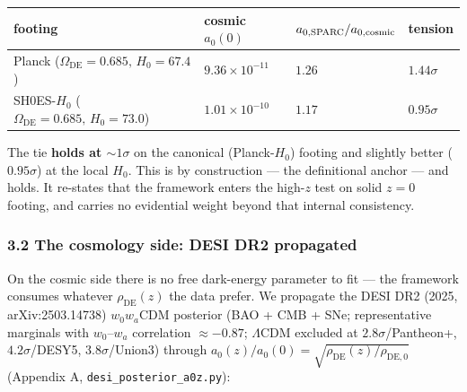 \documentclass[
]{article}
\newcounter{none} %
\begin{document}
{\def\LTcaptype{none} %
\begin{longtable}[]{@{}
  >{\raggedright\arraybackslash}p{}
  >{\raggedright\arraybackslash}p{}
  >{\raggedright\arraybackslash}p{}
  >{\raggedright\arraybackslash}p{}@{}}
\toprule\noalign{}
\begin{minipage}[b]{\linewidth}\raggedright
footing
\end{minipage} & \begin{minipage}[b]{\linewidth}\raggedright
cosmic \(a_0(0)\)
\end{minipage} & \begin{minipage}[b]{\linewidth}\raggedright
\(a_{0,\rm SPARC}/a_{0,\rm cosmic}\)
\end{minipage} & \begin{minipage}[b]{\linewidth}\raggedright
tension
\end{minipage} \\
\midrule\noalign{}
\endhead
\bottomrule\noalign{}
\endlastfoot
Planck (\(\Omega_\mathrm{DE}=0.685,\,H_0=67.4\)) & \(9.36\times10^{-11}\) &
\(1.26\) & \(1.44\sigma\) \\
SH0ES-\(H_0\) (\(\Omega_\mathrm{DE}=0.685,\,H_0=73.0\)) &
\(1.01\times10^{-10}\) & \(1.17\) & \(0.95\sigma\) \\
\end{longtable}
}

The tie \textbf{holds at \(\sim1\sigma\)} on the canonical
(Planck-\(H_0\)) footing and slightly better (\(0.95\sigma\)) at the
local \(H_0\). This is by construction --- the definitional anchor ---
and holds. It re-states that the framework enters the high-\(z\) test on
solid \(z=0\) footing, and carries no evidential weight beyond that
internal consistency.

\subsubsection{3.2 The cosmology side: DESI DR2
propagated}\label{the-cosmology-side-desi-dr2-propagated}

On the cosmic side there is no free dark-energy parameter to fit --- the
framework consumes whatever \(\rho_\mathrm{DE}(z)\) the data prefer. We
propagate the DESI DR2 (2025, arXiv:2503.14738) \(w_0w_a\)CDM posterior
(BAO + CMB + SNe; representative marginals with \(w_0\)--\(w_a\)
correlation \(\approx-0.87\); \(\Lambda\)CDM excluded at
\(2.8\sigma\)/Pantheon+, \(4.2\sigma\)/DESY5, \(3.8\sigma\)/Union3)
through \(a_0(z)/a_0(0)=\sqrt{\rho_\mathrm{DE}(z)/\rho_\mathrm{DE,0}}\)
(Appendix A, \texttt{desi\_posterior\_a0z.py}):
\end{document}
